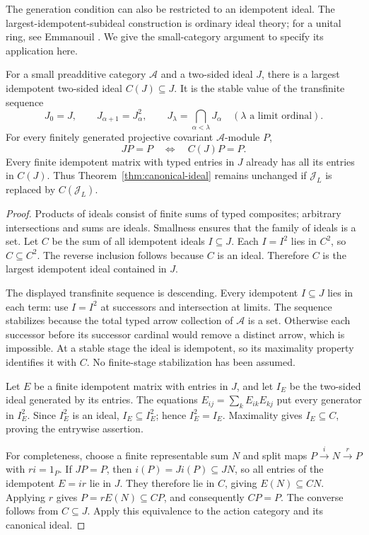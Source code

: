 The generation condition can also be restricted to an idempotent ideal.
The largest-idempotent-subideal construction is ordinary ideal theory;
for a unital ring, see Emmanouil \cite[Lemma~1.3(ii)]{Emmanouil}.
We give the small-category argument to specify its application here.

\begin{proposition}
\label{prop:canonical-ideal-core}
For a small preadditive category $\mathcal A$ and a two-sided ideal
$J$, there is a largest idempotent two-sided ideal $C(J)\subseteq J$.
It is the stable value of the transfinite sequence
\[
 J_0=J,\qquad J_{\alpha+1}=J_\alpha^2,\qquad
 J_\lambda=\bigcap_{\alpha<\lambda}J_\alpha
 \quad(\lambda\text{ a limit ordinal}).
\]
For every finitely generated projective covariant $\mathcal A$-module
$P$,
\[
 JP=P\quad\Longleftrightarrow\quad C(J)P=P.
\]
Every finite idempotent matrix with typed entries in $J$ already has
all its entries in $C(J)$. Thus Theorem~\ref{thm:canonical-ideal}
remains unchanged if $\mathcal J_L$ is replaced by
$C(\mathcal J_L)$.
\end{proposition}

\begin{proof}
Products of ideals consist of finite sums of typed composites;
arbitrary intersections and sums are ideals. Smallness ensures that
the family of ideals is a set. Let $C$ be the sum of all idempotent
ideals $I\subseteq J$. Each $I=I^2$ lies in $C^2$, so $C\subseteq
C^2$. The reverse inclusion follows because $C$ is an ideal.
Therefore $C$ is the largest idempotent ideal contained in $J$.

The displayed transfinite sequence is descending. Every idempotent
$I\subseteq J$ lies in each term: use $I=I^2$ at successors and
intersection at limits. The sequence stabilizes because the total
typed arrow collection of $\mathcal A$ is a set. Otherwise each
successor before its successor cardinal would remove a distinct
arrow, which is impossible. At a stable stage the ideal is idempotent,
so its maximality property identifies it with $C$. No finite-stage
stabilization has been assumed.

Let $E$ be a finite idempotent matrix with entries in $J$, and let
$I_E$ be the two-sided ideal generated by its entries. The equations
$E_{ij}=\sum_k E_{ik}E_{kj}$ put every generator in $I_E^2$.
Since $I_E^2$ is an ideal, $I_E\subseteq I_E^2$; hence
$I_E^2=I_E$. Maximality gives $I_E\subseteq C$, proving the
entrywise assertion.

For completeness, choose a finite representable sum $N$ and split
maps $P\xrightarrow{i}N\xrightarrow{r}P$ with $ri=1_P$.
If $JP=P$, then $i(P)=J i(P)\subseteq JN$, so all entries of the
idempotent $E=ir$ lie in $J$. They therefore lie in $C$, giving
$E(N)\subseteq CN$. Applying $r$ gives $P=rE(N)\subseteq CP$,
and consequently $CP=P$. The converse follows from $C\subseteq J$.
Apply this equivalence to the action category and its canonical ideal.
\end{proof}

